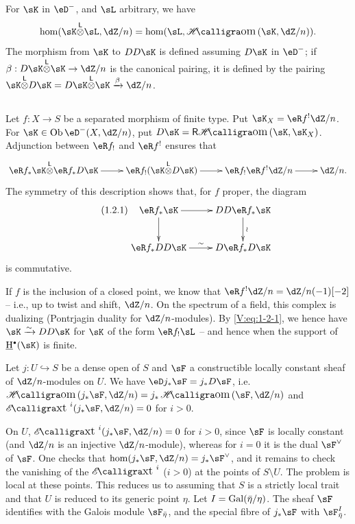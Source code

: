 For $\sK$ in $\eD^-$, and $\sL$ arbitrary, we have
\[
  \hom(\sK\lotimes \sL,\dZ/n) = \hom(\sL,\Hom(\sK,\dZ/n)) \text{.}
\]
The morphism from $\sK$ to $DD\sK$ is defined assuming $D\sK$ in
$\eD^-$; if $\beta:D\sK\lotimes\sK\to \dZ/n$ is the canonical pairing, it
is defined by the pairing
$\sK\lotimes D\sK=D\sK\lotimes \sK \xrightarrow\beta \dZ/n$.




\subsection{}\label{V:1-2}

Let $f:X\to S$ be a separated morphism of finite type. Put
$\sK_X=\eR f^!\dZ/n$. For $\sK\in \ob\eD^-(X,\dZ/n)$, put
$D\sK = \rHom(\sK,\sK_X)$. Adjunction between $\eR f_!$ and $\eR f^!$
ensures that
\[\xymatrix{
  \eR f_\ast \sK\lotimes \eR f_\ast D\sK \ar[r]
    & \eR f_! (\sK\lotimes D\sK) \ar[r]
    & \eR f_! \eR f^! \dZ/n \ar[r]
    & \dZ/n \text{.}
}\]
The symmetry of this description shows that, for $f$ proper, the diagram
\begin{equation*}\tag{1.2.1}\label{V:eq:1-2-1}
\xymatrix{
  \eR f_\ast \sK \ar[r] \ar[d]
    & D D \eR f_\ast \sK \ar[d]^-\wr \\
  \eR f_\ast D D \sK \ar[r]^\sim
    & D\eR f_\ast D\sK
}
\end{equation*}
is commutative.

If $f$ is the inclusion of a closed point, we know that
$\eR f^!\dZ/n=\dZ/n(-1)[-2]$ -- i.e., up to twist and shift, $\dZ/n$.
On the spectrum of a field, this complex is dualizing (Pontrjagin duality
for $\dZ/n$-modules). By \eqref{V:eq:1-2-1}, we hence have
$\sK\iso D D\sK$ for $\sK$ of the form $\eR f_!\sL$ -- and hence when the
support of $\underline\h^\bullet(\sK)$ is finite.




\begin{theorem_}\label{V:1-3}
Let $j:U\hookrightarrow S$ be a dense open of $S$ and $\sF$ a constructible
locally constant sheaf of $\dZ/n$-modules on $U$. We have
$\eD j_\ast \sF = j_\ast D \sF$, i.e.\ $\Hom(j_\ast \sF,\dZ/n) = j_\ast\Hom(\sF,\dZ/n)$ and $\Ext^i(j_\ast\sF,\dZ/n) = 0$ for $i>0$.
\end{theorem_}

On $U$, $\Ext^i(j_\ast\sF,\dZ/n)=0$ for $i>0$, since $\sF$ is locally
constant (and $\dZ/n$ is an injective $\dZ/n$-module), whereas for $i=0$
it is the dual $\sF^\vee$ of $\sF$. One checks that
$\hom(j_\ast\sF,\dZ/n)=j_\ast\sF^\vee$, and it remains to check the vanishing
of the $\Ext^i$ ($i>0$) at the points of $S\setminus U$. The problem is local
at these points. This reduces us to assuming that $S$ is a strictly local
trait and that $U$ is reduced to its generic point $\eta$. Let
$I=\operatorname{Gal}(\bar\eta/\eta)$. The sheaf $\sF$ identifies with the Galois module
$\sF_{\bar\eta}$, and the special fibre of $j_\ast \sF$ with
$\sF_{\bar\eta}^I$.

